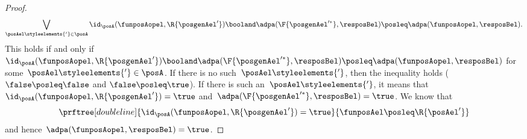 \begin{proof}
\begin{equation*}
        \label{eq:dp_unit_2}
        \bigvee_{\posAel\styleelements{'}\in \posA}\id_\posA(\funposAopel,\R{\posgenAel'})\booland \adpa(\F{\posgenAel'^*},\resposBel) \posleq \adpa(\funposAopel,\resposBel).
    \end{equation*}
    This holds if and only if~$\id_\posA(\funposAopel,\R{\posgenAel'})\booland \adpa(\F{\posgenAel'^*},\resposBel) \posleq \adpa(\funposAopel,\resposBel)$ for some~$\posAel\styleelements{'}\in \posA$.
    If there is no such~$\posAel\styleelements{'}$, then the inequality holds ($\false \posleq \false$ and $\false \posleq \true$).
    If there is such an~$\posAel\styleelements{'}$, it means that~$\id_\posA(\funposAopel,\R{\posgenAel'})=\true$ and~$\adpa(\F{\posgenAel'^*},\resposBel)=\true$.
    We know that
    \begin{equation*}
        \prftree[double line]{\id_\posA(\funposAopel,\R{\posgenAel'})=\true}{\funposAel \posleq \R{\posAel'}}
    \end{equation*}
    and hence~$\adpa(\funposAopel,\resposBel)=\true$.
\end{proof}